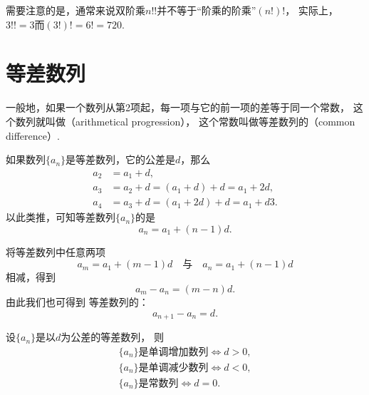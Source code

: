 需要注意的是，通常来说双阶乘\(n!!\)并不等于“阶乘的阶乘”\((n!)!\)，
实际上，\(3!! = 3\)而\((3!)! = 6! = 720\).

\section{等差数列}
一般地，如果一个数列从第2项起，每一项与它的前一项的差等于同一个常数，
这个数列就叫做（arithmetical progression），
这个常数叫做等差数列的（common difference）.

如果数列\(\{a_n\}\)是等差数列，它的公差是\(d\)，那么\begin{align*}
    a_2 &= a_1 + d, \\
    a_3 &= a_2 + d = (a_1 + d) + d = a_1 + 2d, \\
    a_4 &= a_3 + d = (a_1 + 2d) + d = a_1 + d3.
\end{align*}
以此类推，可知等差数列\(\{a_n\}\)的是\begin{equation}
    a_n = a_1 + (n-1) d.
\end{equation}

将等差数列中任意两项\begin{equation*}
    a_m = a_1 + (m-1) d
    \quad\text{与}\quad
    a_n = a_1 + (n-1) d
\end{equation*}相减，得到\begin{equation*}
    a_m - a_n = (m-n) d.
\end{equation*}
由此我们也可得到%
等差数列的：\begin{equation}
    a_{n+1} - a_n = d.
\end{equation}

\begin{theorem}
设\(\{a_n\}\)是以\(d\)为公差的等差数列，
则\begin{gather*}
	\text{$\{a_n\}$是单调增加数列}
	\iff
	d > 0, \\
	\text{$\{a_n\}$是单调减少数列}
	\iff
	d < 0, \\
	\text{$\{a_n\}$是常数列}
	\iff
	d = 0.
\end{gather*}
\end{theorem}


